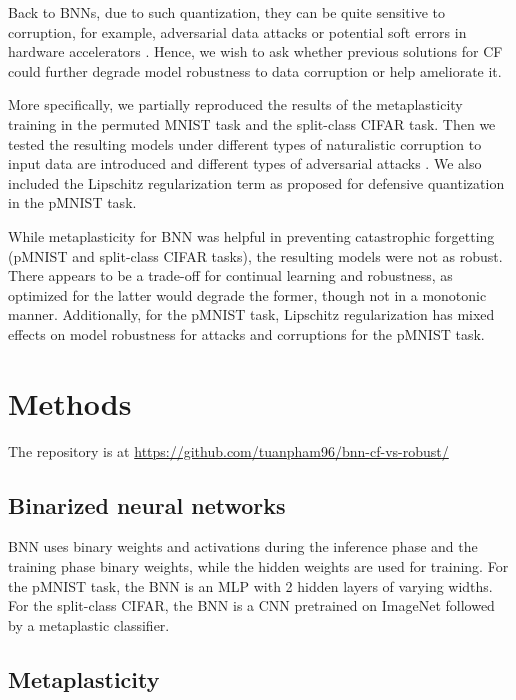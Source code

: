 \documentclass[manuscript,screen,review=false, nonacm]{acmart}
\begin{document}
Back to BNNs, due to such quantization, they can be quite sensitive to corruption, for example, adversarial data attacks \cite{Lin_2019} or potential soft errors in hardware accelerators \cite{Khoshavi2020}. Hence, we wish to ask whether previous solutions for CF \cite{Laborieux_Ernoult_Hirtzlin_Querlioz_2021} could further degrade model robustness to data corruption or help ameliorate it. 

More specifically, we partially reproduced the results of the metaplasticity training in the permuted MNIST task and the split-class CIFAR task. Then we tested the resulting models under different types of naturalistic corruption to input data are introduced \cite{Hendrycks_2018} and different types of adversarial attacks \cite{rauber2017foolboxnative,rauber2017foolbox,Goodfellow2014-bu}. We also included the Lipschitz regularization term as proposed for defensive quantization \cite{Lin_2019} in the pMNIST task. 

While metaplasticity for BNN was helpful in preventing catastrophic forgetting (pMNIST and split-class CIFAR tasks), the resulting models were not as robust. There appears to be a trade-off for continual learning and robustness, as optimized for the latter would degrade the former, though not in a monotonic manner. Additionally, for the pMNIST task, Lipschitz regularization has mixed effects on model robustness for attacks and corruptions for the pMNIST task.

\section{Methods}

The repository is at \url{https://github.com/tuanpham96/bnn-cf-vs-robust/}

\subsection{Binarized neural networks}

BNN uses binary weights and activations during the inference phase and the training phase binary weights, while the hidden weights are used for training. For the pMNIST task, the BNN is an MLP with 2 hidden layers of varying widths. For the split-class CIFAR, the BNN is a CNN pretrained on ImageNet followed by a metaplastic classifier.

\subsection{Metaplasticity}
\end{document}
